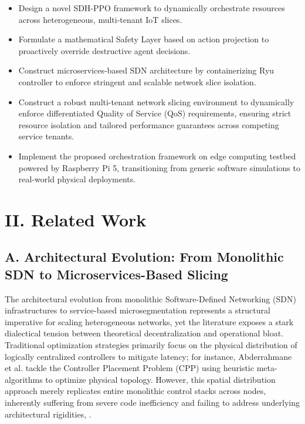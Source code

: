 \begin{itemize}
\item
  Design a novel SDH-PPO framework to dynamically orchestrate resources across heterogeneous, multi-tenant IoT slices.
\item
  Formulate a mathematical Safety Layer based on action projection to proactively override destructive agent decisions.
\item
  Construct microservices-based SDN architecture by containerizing Ryu controller to enforce stringent and scalable network slice isolation.
\item
  Construct a robust multi-tenant network slicing environment to dynamically enforce differentiated Quality of Service (QoS) requirements, ensuring strict resource isolation and tailored performance guarantees across competing service tenants.
\item
  Implement the proposed orchestration framework on edge computing testbed powered by Raspberry Pi 5, transitioning from generic software simulations to real-world physical deployments.
\end{itemize}

\section{II. Related Work}\label{ii.-related-work}

\subsection{A. Architectural Evolution: From Monolithic SDN to Microservices-Based Slicing}\label{a.-architectural-evolution-from-monolithic-sdn-to-microservices-based-slicing}

The architectural evolution from monolithic Software-Defined Networking (SDN) infrastructures to service-based microsegmentation represents a structural imperative for scaling heterogeneous networks, yet the literature exposes a stark dialectical tension between theoretical decentralization and operational bloat. Traditional optimization strategies primarily focus on the physical distribution of logically centralized controllers to mitigate latency; for instance, Abderrahmane et al. tackle the Controller Placement Problem (CPP) using heuristic meta-algorithms to optimize physical topology\cite{b19}. However, this spatial distribution approach merely replicates entire monolithic control stacks across nodes, inherently suffering from severe code inefficiency and failing to address underlying architectural rigidities\cite{b8}, \cite{b19}.

